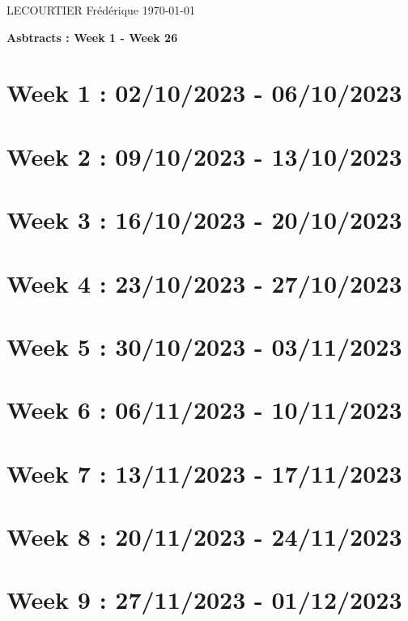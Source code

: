 \documentclass[french]{article}
\begin{document}
	LECOURTIER Frédérique \hfill \today
	\begin{center}
		\Large\textbf{{Asbtracts : Week 1 - Week 26}}
	\end{center}

	\section{Week 1 : 02/10/2023 - 06/10/2023}
	

	\section{Week 2 : 09/10/2023 - 13/10/2023}
	

	\section{Week 3 : 16/10/2023 - 20/10/2023}
	

	\section{Week 4 : 23/10/2023 - 27/10/2023}
	

	\section{Week 5 : 30/10/2023 - 03/11/2023}
	

	\section{Week 6 : 06/11/2023 - 10/11/2023}
	

	\section{Week 7 : 13/11/2023 - 17/11/2023}
	

	\section{Week 8 : 20/11/2023 - 24/11/2023}
	

	\section{Week 9 : 27/11/2023 - 01/12/2023}
	
\end{document}
